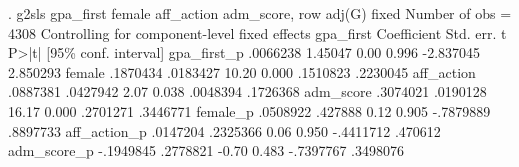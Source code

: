 . g2sls gpa_first female aff_action adm_score, row adj(G) fixed
{\smallskip}
                                                  Number of obs =       4308
Controlling for component-level fixed effects
   gpa_first {\VBAR} Coefficient  Std. err.      t    P>|t|     [95\% conf. interval]
 gpa_first_p {\VBAR}   .0066238    1.45047     0.00   0.996    -2.837045    2.850293
      female {\VBAR}   .1870434   .0183427    10.20   0.000     .1510823    .2230045
  aff_action {\VBAR}   .0887381   .0427942     2.07   0.038     .0048394    .1726368
   adm_score {\VBAR}   .3074021   .0190128    16.17   0.000     .2701271    .3446771
    female_p {\VBAR}   .0508922    .427888     0.12   0.905    -.7879889    .8897733
aff_action_p {\VBAR}   .0147204   .2325366     0.06   0.950    -.4411712     .470612
 adm_score_p {\VBAR}  -.1949845   .2778821    -0.70   0.483    -.7397767    .3498076
